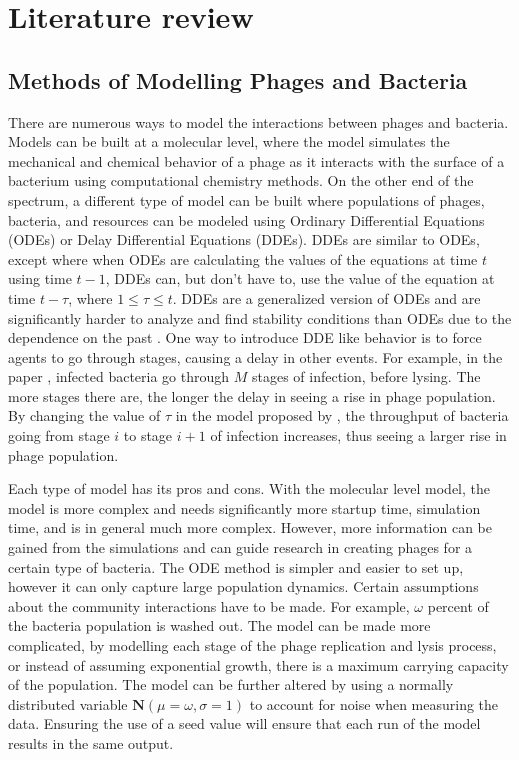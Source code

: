 \chapter{Literature review}
\label{LR}

\section{Methods of Modelling Phages and Bacteria}
There are numerous ways to model the interactions between phages and bacteria.
Models can be built at a molecular level, where the model simulates the mechanical and chemical behavior of a phage as it interacts with the surface of a bacterium using computational chemistry methods.
On the other end of the spectrum, a different type of model can be built where populations of phages, bacteria, and resources can be modeled using Ordinary Differential Equations (ODEs) or Delay Differential Equations (DDEs).
DDEs are similar to ODEs, except where when ODEs are calculating the values of the equations at time $t$ using time $t-1$, DDEs can, but don't have to, use the value of the equation at time $t-\tau$, where $1 \leq \tau \leq t$. 
DDEs are a generalized version of ODEs and are significantly harder to analyze and find stability conditions than ODEs due to the dependence on the past \cite{liExploringComplicatedBehaviors2023}. \newline
One way to introduce DDE like behavior is to force agents to go through stages, causing a delay in other events. 
For example, in the paper \citet{gengUsingBacterialPopulation2024}, infected bacteria go through $M$ stages of infection, before lysing. 
The more stages there are, the longer the delay in seeing a rise in phage population. By changing the value of $\tau$ in the model proposed by \citet{gengUsingBacterialPopulation2024}, the throughput of bacteria going from stage $i$ to stage $i+1$ of infection increases, thus seeing a larger rise in phage population. 
\newline


Each type of model has its pros and cons.
With the molecular level model, the model is more complex and needs significantly more startup time, simulation time, and is in general much more complex.
However, more information can be gained from the simulations and can guide research in creating phages for a certain type of bacteria.
The ODE method is simpler and easier to set up, however it can only capture large population dynamics.
Certain assumptions about the community interactions have to be made.
For example, $\omega$ percent of the bacteria population is washed out.
The model can be made more complicated, by modelling each stage of the phage replication and lysis process, or instead of assuming exponential growth, there is a maximum carrying capacity of the population.
The model can be further altered by using a normally distributed variable $\textbf{N}(\mu=\omega, \sigma=1)$ to account for noise when measuring the data. 
Ensuring the use of a seed value will ensure that each run of the model results in the same output. 

